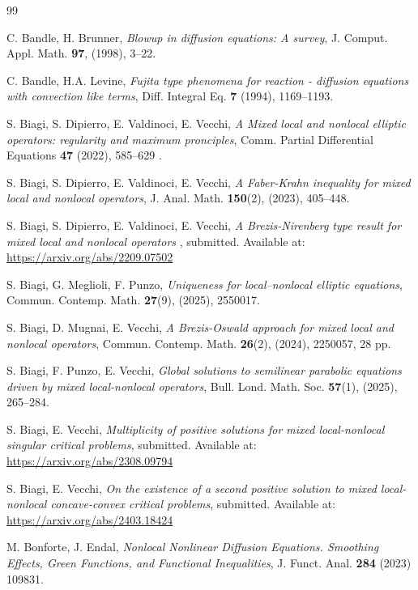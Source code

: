 \documentclass[11pt,a4paper,reqno]{amsart}
\theoremstyle{definition}
\theoremstyle{plain}
\numberwithin{equation}{section}
\begin{document}
\begin{thebibliography}{99}

 C. Bandle, H. Brunner,
{\it Blowup in diffusion equations: A survey},
J. Comput. Appl. Math. {\bf 97}, (1998), 3--22.
	

 C. Bandle, H.A. Levine, {\it Fujita type phenomena for reaction - diffusion equations with
convection like terms}, Diff. Integral Eq. {\bf 7} (1994), 1169--1193.


 S. Biagi, S. Dipierro, E. Valdinoci, E. Vecchi,
{\it A Mixed local and nonlocal elliptic operators: regularity and maximum pronciples},
Comm. Partial Differential Equations {\bf 47} (2022), 585--629 .

 S. Biagi, S. Dipierro, E. Valdinoci, E. Vecchi,
{\it  A Faber-Krahn inequality for mixed local and nonlocal operators}, J. Anal. Math. {\bf 150}(2), (2023), 405--448.

 S. Biagi, S. Dipierro, E. Valdinoci, E. Vecchi,
{\it  A Brezis-Nirenberg type result for mixed local and nonlocal operators }, submitted.
Available at: \url{https://arxiv.org/abs/2209.07502}

	S. Biagi, G. Meglioli, F. Punzo,
	{\em Uniqueness for local--nonlocal elliptic equations},
	Commun. Contemp. Math. {\bf 27}(9), (2025), 2550017.


 S. Biagi, D. Mugnai, E. Vecchi,
{\it A Brezis-Oswald approach for mixed local and nonlocal operators},
Commun. Contemp. Math. {\bf 26}(2), (2024), 2250057, 28 pp.

 S. Biagi, F. Punzo, E. Vecchi,
  \emph{Global solutions to semilinear parabolic equations driven by mixed local-nonlocal operators},
  Bull. Lond. Math. Soc. \textbf{57}(1), (2025), 265--284.

 S. Biagi, E. Vecchi,
{\em Multiplicity of positive solutions for mixed local-nonlocal singular critical problems}, submitted.
Available at: \url{https://arxiv.org/abs/2308.09794}

 S. Biagi, E. Vecchi,
{\em On the existence of a second positive solution to mixed local-nonlocal
concave-convex critical problems}, submitted.
Available at: \url{https://arxiv.org/abs/2403.18424}

 M. Bonforte, J. Endal, {\it Nonlocal Nonlinear Diffusion Equations. Smoothing Effects,
Green Functions, and Functional Inequalities}, J. Funct. Anal. {\bf 284} (2023) 109831.


\end{thebibliography}
\end{document}
